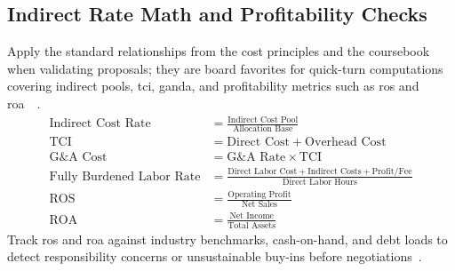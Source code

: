 \documentclass[../main.tex]{subfiles}
\begin{document}
\subsection{Indirect Rate Math and Profitability Checks}
Apply the standard relationships from the cost principles and the coursebook when validating proposals; they are board favorites for quick-turn computations covering indirect pools, \ac{tci}, \ac{ganda}, and profitability metrics such as \ac{ros} and \ac{roa}~\autocite[\S\S~31.201-2, 31.202, 31.203]{FAR}~\autocite{edo-3-2-4-cost-price-evaluation-2024}.
\begin{align}
  \text{Indirect Cost Rate}        & = \frac{\text{Indirect Cost Pool}}{\text{Allocation Base}}\label{eq:indirect_rate}                                                \\
  \text{TCI}                       & = \text{Direct Cost} + \text{Overhead Cost}\label{eq:tci}                                                                         \\
  \text{G\&A Cost}                 & = \text{G\&A Rate} \times \text{TCI}\label{eq:ganda_cost}                                                                         \\
  \text{Fully Burdened Labor Rate} & = \frac{\text{Direct Labor Cost} + \text{Indirect Costs} + \text{Profit/Fee}}{\text{Direct Labor Hours}}\label{eq:fully_burdened} \\
  \text{ROS}                       & = \frac{\text{Operating Profit}}{\text{Net Sales}}\label{eq:ros}                                                                  \\
  \text{ROA}                       & = \frac{\text{Net Income}}{\text{Total Assets}}\label{eq:roa}
\end{align}
Track \ac{ros} and \ac{roa} against industry benchmarks, cash-on-hand, and debt loads to detect responsibility concerns or unsustainable buy-ins before negotiations~\autocite{edo-3-2-4-cost-price-evaluation-2024}.
\end{document}
